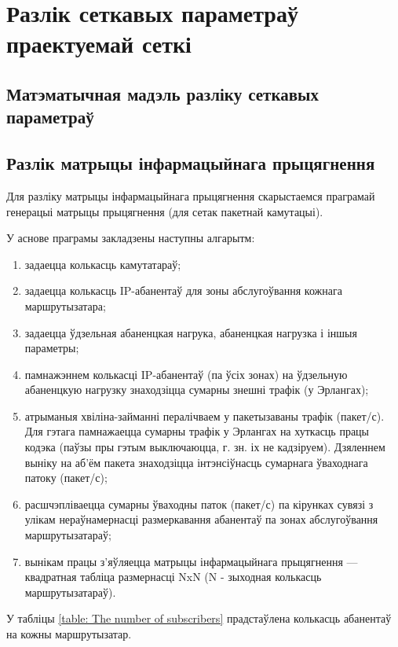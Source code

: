\section{Разлік сеткавых параметраў праектуемай сеткі}

\subsection{Матэматычная мадэль разліку сеткавых параметраў}

\subsection{Разлік матрыцы інфармацыйнага прыцягнення}

Для разліку матрыцы інфармацыйнага прыцягнення скарыстаемся
праграмай генерацыі матрыцы прыцягнення (для сетак пакетнай камутацыі).

У аснове праграмы закладзены наступны алгарытм:
\begin{enumerate}
    \item задаецца колькасць камутатараў;
    \item задаецца колькасць IP-абанентаў для зоны абслугоўвання
          кожнага маршрутызатара;
    \item задаецца ўдзельная абаненцкая нагрука,
          абаненцкая нагрузка і іншыя параметры;
    \item памнажэннем колькасці IP-абанентаў (па ўсіх зонах)
          на ўдзельную абаненцкую нагрузку знаходзіцца
          сумарны знешні трафік (у Эрлангах);
    \item атрыманыя хвіліна-займанні пералічваем у пакетызаваны
          трафік (пакет/с).
          Для гэтага памнажаецца сумарны трафік у Эрлангах на
          хуткасць працы кодэка (паўзы пры гэтым выключаюцца,
          г. зн. іх не кадзіруем). Дзяленнем выніку на
          аб'ём пакета знаходзіцца інтэнсіўнасць
          сумарнага ўваходнага патоку (пакет/с);
    \item расшчэпліваецца сумарны ўваходны паток (пакет/с) па
          кірунках сувязі з улікам нераўнамернасці размеркавання
          абанентаў па зонах абслугоўвання маршрутызатараў;
    \item вынікам працы з'яўляецца матрыцы інфармацыйнага прыцягнення ---
          квадратная таб\-лі\-ца размернасці NxN (N - зыходная колькасць
          маршрутызатараў).
\end{enumerate}

У табліцы \ref{table: The number of subscribers} прадстаўлена
колькасць абанентаў на кожны маршрутызатар.

